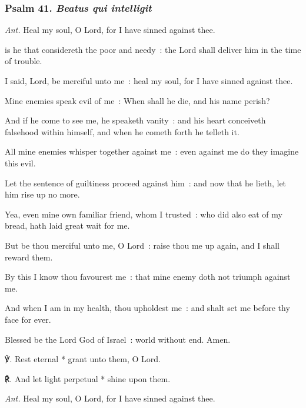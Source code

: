 \subsubsection{Psalm 41. \textit{Beatus qui intelligit}}\par\noindent
\textit{Ant.} Heal my soul, {\dag} O Lord, for I have sinned against thee.\par
{} is he that considereth the poor and needy~: the Lord shall deliver him in the time of trouble.\par
{}
I said, Lord, be merciful unto me~: heal my soul, for I have sinned against thee.\par
{}Mine enemies speak evil of me~: When shall he die, and his name perish?\par
{}And if he come to see me, he speaketh vanity~: and his heart conceiveth falsehood within himself, and when he cometh forth he telleth it.\par
{}All mine enemies whisper together against me~: even against me do they imagine this evil.\par
{}Let the sentence of guiltiness proceed against him~: and now that he lieth, let him rise up no more.\par
{}Yea, even mine own familiar friend, whom I trusted~: who did also eat of my bread, hath laid great wait for me.\par
{}But be thou merciful unto me, O Lord~: raise thou me up again, and I shall reward them.\par
{}By this I know thou favourest me~: that mine enemy doth not triumph against me.\par
{}And when I am in my health, thou upholdest me~: and shalt set me before thy face for ever.\par
{}Blessed be the Lord God of Israel~: world without end. Amen.\par
℣. Rest eternal * grant unto them, O Lord.\par
℟. And let light perpetual * shine upon them.\par\noindent
\textit{Ant.} Heal my soul, O Lord, for I have sinned against thee.\par

